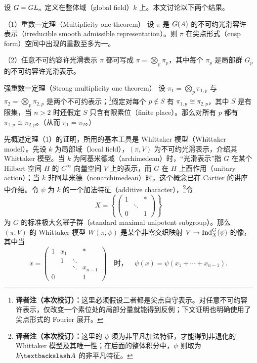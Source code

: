 设 $G=GL_n$ 定义在整体域（global field）$k$ 上。本文讨论以下两个结果。
\begin{originaltheorem}{（1）重数一定理（Multiplicity one theorem）}
设 $\pi$ 是 $G(A)$ 的不可约光滑容许表示（irreducible smooth admissible representation）。则 $\pi$ 在尖点形式（cusp form）空间中出现的重数至多为一。
\end{originaltheorem}
（2）任意不可约容许光滑表示 $\pi$ 都可写成 $\pi=\bigotimes_p\pi_p$，其中每个 $\pi_p$ 是局部群 $G_p$ 的不可约容许光滑表示。
\begin{originaltheorem}{强重数一定理（Strong multiplicity one theorem）}
设 $\pi_1=\bigotimes_p\pi_{1,p}$ 与 $\pi_2=\bigotimes_p\pi_{2,p}$ 是两个不可约表示；\footnote{\textbf{译者注（本次校订）：}这里必须假设二者都是尖点自守表示。对任意不可约容许表示，仅改变一个素位处的局部分量就能得到反例；下文证明也明确使用了尖点形式的 Fourier 展开。}假定对每个 $p\notin S$ 有 $\pi_{1,p}\cong\pi_{2,p}$，其中 $S$ 是有限集，当 $n>2$ 时还假定 $S$ 只含有限素位（finite place）。那么对所有 $p$ 都有 $\pi_{1,p}\cong\pi_{2,p}$。（从而 $\pi_1=\pi_2$。）
\end{originaltheorem}
先概述定理（1）的证明，所用的基本工具是 Whittaker 模型（Whittaker model）。先设 $k$ 为局部域（local field），$(\pi,V)$ 为不可约光滑表示，介绍其 Whittaker 模型。当 $k$ 为阿基米德域（archimedean）时，“光滑表示”指 $G$ 在某个 Hilbert 空间 $H$ 的 $C^\infty$ 向量空间 $V$ 上的表示，而 $G$ 在 $H$ 上酉作用（unitary action）；当 $k$ 非阿基米德（nonarchimedean）时，这个概念已在 Cartier 的讲座中介绍。令 $\psi$ 为 $k$ 的一个加法特征（additive character），\footnote{\textbf{译者注（本次校订）：}这里的 $\psi$ 须为非平凡加法特征，才能得到非退化的 Whittaker 模型及其唯一性；在后面的整体积分中，$\psi$ 则取为 $k\backslash\A$ 的非平凡特征。}令
\[
X=\left\{\begin{pmatrix}1&&*\\&\ddots&\\0&&1\end{pmatrix}\right\}
\]
为 $G$ 的标准极大幺幂子群（standard maximal unipotent subgroup）。那么 $(\pi,V)$ 的 Whittaker 模型 $W(\pi,\psi)$ 是某个非零交织映射 $V\to\operatorname{Ind}_X^G(\psi)$ 的像，其中当
\[
x=\begin{pmatrix}1&x_1&&*\\&1&\ddots&\\&&\ddots&x_{n-1}\\0&&&1\end{pmatrix}
\quad\text{时，}\quad \psi(x)=\psi(x_1+\cdots+x_{n-1}).
\]
